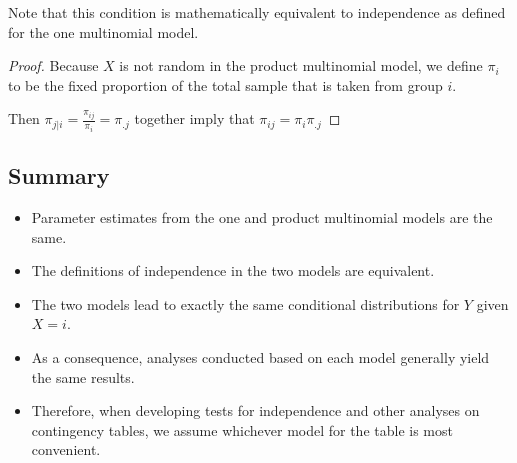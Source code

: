 Note that this condition is mathematically equivalent to
independence as defined for the one multinomial model.

\begin{proof}
	Because $X$ is not random in the product multinomial model, we
	define $\pi_i$ to be the fixed proportion of the total sample that is
	taken from group $i$.
	
	Then $\pi_{j|i} = \frac{\pi_{ij}}{\pi_i} = \pi_{.j}$
together imply that $\pi_{ij} = \pi_i \pi_{.j}$
\end{proof}

\subsection{Summary}
\begin{itemize}
	\item Parameter estimates from the one and product multinomial
	models are the same.
	\item The definitions of independence in the two models are
	equivalent.
	\item The two models lead to exactly the same conditional
	distributions for $Y$ given $X = i$.
	\item As a consequence, analyses conducted based on each model
	generally yield the same results.
	\item Therefore, when developing tests for independence and other
	analyses on contingency tables, we assume whichever model for
	the table is most convenient.
\end{itemize}